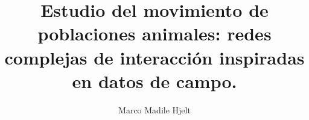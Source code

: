 \documentclass[12pt,screen,twoside,pagebackref]{ibtesis}
\title{Estudio del movimiento de poblaciones animales: redes complejas de interacción inspiradas en datos de campo.}
\author{Marco Madile Hjelt}
\begin{document}

\begin{preliminary}




\tableofcontents                %

\listoffigures                  %

\listoftables                   %



\end{preliminary}







%

\begin{biblio}

\end{biblio}
\end{document}
